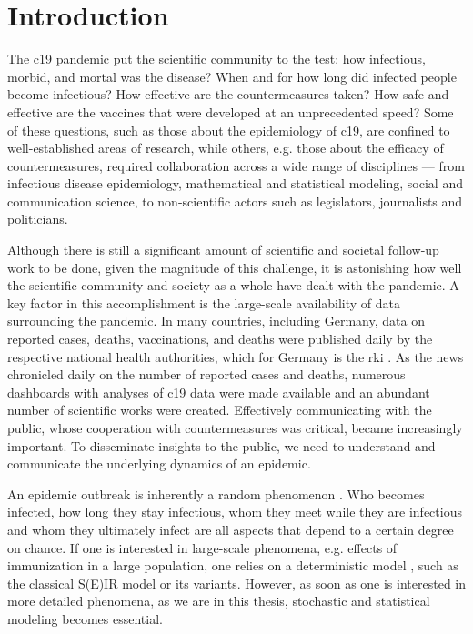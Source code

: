 \chapter{Introduction}
\label{cha:introduction}
\glsresetall

The \gls{c19} pandemic put the scientific community to the test: how infectious, morbid, and mortal was the disease? When and for how long did infected people become infectious? How effective are the countermeasures taken? How safe and effective are the vaccines that were developed at an unprecedented speed? Some of these questions, such as those about the epidemiology of \gls{c19}, are confined to well-established areas of research, while others, e.g. those about the efficacy of countermeasures, required collaboration across a wide range of disciplines --- from infectious disease epidemiology, mathematical and statistical modeling, social and communication science, to non-scientific actors such as legislators, journalists and politicians.

Although there is still a significant amount of scientific and societal follow-up work to be done, given the magnitude of this challenge, it is astonishing how well the scientific community and society as a whole have dealt with the pandemic. A key factor in this accomplishment is the large-scale availability of data surrounding the pandemic. In many countries, including Germany, data on reported cases, deaths, vaccinations, and deaths were published daily by the respective national health authorities, which for Germany is the \gls{rki} \citep{RobertKoch-Institut2022SARSCoV2,RobertKoch-Institut2021COVID19Hospitalisierungen}.
As the news chronicled daily on the number of reported cases and deaths, numerous dashboards with analyses of \gls{c19} data were made available and an abundant number of scientific works were created. Effectively communicating with the public, whose cooperation with countermeasures was critical, became increasingly important. To disseminate insights to the public, we need to understand and communicate the underlying dynamics of an epidemic.

An epidemic outbreak is inherently a random phenomenon \citep{Diekmann2013Mathematical}. Who becomes infected, how long they stay infectious, whom they meet while they are infectious and whom they ultimately infect are all aspects that depend to a certain degree on chance. If one is interested in large-scale phenomena, e.g. effects of immunization in a large population, one relies on a deterministic model \citep{Britton2019Stochastic}, such as the classical S(E)IR model \citep{Kermack1927Contribution} or its variants. However, as soon as one is interested in more detailed phenomena, as we are in this thesis, stochastic and statistical modeling becomes essential. 

